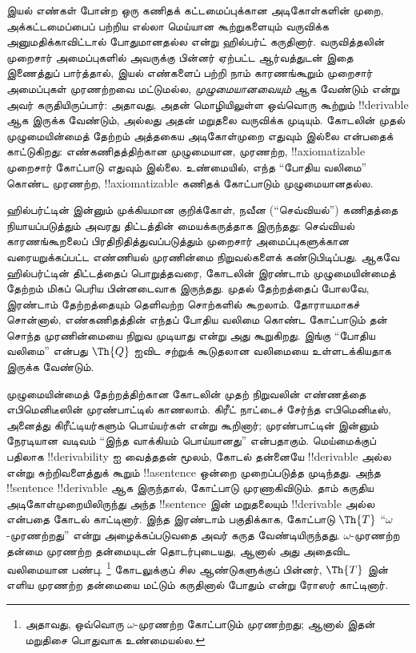 \documentclass[../../../include/open-logic-section]{subfiles}
\begin{document}



இயல் எண்கள் போன்ற ஒரு கணிதக் கட்டமைப்புக்கான அடிகோள்களின் முறை,
அக்கட்டமைப்பைப் பற்றிய எல்லா மெய்யான கூற்றுகளையும் வருவிக்க அனுமதிக்காவிட்டால்
போதுமானதல்ல என்று ஹில்பர்ட் கருதினார். வருவித்தலின் முறைசார் அமைப்புகளில்
அவருக்கு பின்னர் ஏற்பட்ட ஆர்வத்துடன் இதை இணைத்துப் பார்த்தால், இயல் எண்களைப்
பற்றி நாம் காரணங்கூறும் முறைசார் அமைப்புகள் முரணற்றவை மட்டுமல்ல,
\emph{முழுமையானவையும்} ஆக வேண்டும் என்று அவர் கருதியிருப்பார்: அதாவது, அதன்
மொழியிலுள்ள ஒவ்வொரு கூற்றும் !!{derivable} ஆக இருக்க வேண்டும், அல்லது
அதன் மறுதலை வருவிக்க முடியும். கோடலின் முதல்
முழுமையின்மைத் தேற்றம் அத்தகைய அடிகோள்முறை எதுவும் இல்லை என்பதைக்
காட்டுகிறது: எண்கணிதத்திற்கான முழுமையான, முரணற்ற, !!{axiomatizable}
முறைசார் கோட்பாடு எதுவும் இல்லை. உண்மையில், எந்த “போதிய வலிமை”
கொண்ட முரணற்ற, !!{axiomatizable} கணிதக் கோட்பாடும் முழுமையானதல்ல.

ஹில்பர்ட்டின் இன்னும் முக்கியமான குறிக்கோள், நவீன (“செவ்வியல்”)
கணிதத்தை நியாயப்படுத்தும் அவரது திட்டத்தின் மையக்கருத்தாக இருந்தது:
செவ்வியல் காரணங்கூறலைப் பிரதிநிதித்துவப்படுத்தும் முறைசார் அமைப்புகளுக்கான
வரையறுக்கப்பட்ட எண்ணியல் முரணின்மை நிறுவல்களைக் கண்டுபிடிப்பது. ஆகவே
ஹில்பர்ட்டின் திட்டத்தைப் பொறுத்தவரை, கோடலின் இரண்டாம் முழுமையின்மைத்
தேற்றம் மிகப் பெரிய பின்னடைவாக இருந்தது. முதல் தேற்றத்தைப் போலவே,
இரண்டாம் தேற்றத்தையும் தெளிவற்ற சொற்களில் கூறலாம். தோராயமாகச் சொன்னால்,
எண்கணிதத்தின் எந்தப் போதிய வலிமை கொண்ட கோட்பாடும் தன் சொந்த
முரணின்மையை நிறுவ முடியாது என்று அது கூறுகிறது. இங்கு “போதிய
வலிமை” என்பது $\Th{Q}$ ஐவிட சற்றுக் கூடுதலான வலிமையை உள்ளடக்கியதாக
இருக்க வேண்டும்.

முழுமையின்மைத் தேற்றத்திற்கான கோடலின் முதற் நிறுவலின் எண்ணத்தை
எபிமெனிடீஸின் முரண்பாட்டில் காணலாம். கிரீட் நாட்டைச் சேர்ந்த எபிமெனிடீஸ்,
அனைத்து கிரீட்டியர்களும் பொய்யர்கள் என்று கூறினார்; முரண்பாட்டின் இன்னும்
நேரடியான வடிவம் “இந்த வாக்கியம் பொய்யானது” என்பதாகும். மெய்மைக்குப்
பதிலாக !!{derivability} ஐ வைத்ததன் மூலம், கோடல் தன்னையே
!!{derivable} அல்ல என்று சுற்றிவளைத்துக் கூறும் !!a{sentence} ஒன்றை
முறைப்படுத்த முடிந்தது. அந்த !!{sentence} !!{derivable} ஆக இருந்தால்,
கோட்பாடு முரணாகிவிடும். தாம் கருதிய அடிகோள்முறையிலிருந்து அந்த
!!{sentence} இன் மறுதலையும் !!{derivable} அல்ல என்பதை கோடல் காட்டினார்.
இந்த இரண்டாம் பகுதிக்காக, கோட்பாடு $\Th{T}$ “$\omega$-முரணற்றது”
என்று அழைக்கப்படுவதை அவர் கருத வேண்டியிருந்தது.
$\omega$-முரணற்ற தன்மை முரணற்ற தன்மையுடன் தொடர்புடையது, ஆனால் அது
அதைவிட வலிமையான பண்பு.
\footnote{அதாவது, ஒவ்வொரு $\omega$-முரணற்ற கோட்பாடும் முரணற்றது;
ஆனால் இதன் மறுதிசை பொதுவாக உண்மையல்ல.}
கோடலுக்குப் சில ஆண்டுகளுக்குப் பின்னர், $\Th{T}$ இன் எளிய முரணற்ற
தன்மையை மட்டும் கருதினால் போதும் என்று ரோஸர் காட்டினார்.
\end{document}
